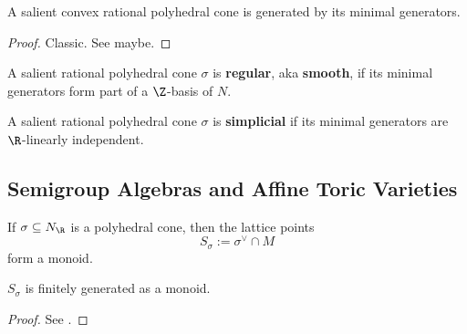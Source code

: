 \begin{lemma}
  \label{1-2-15-cone-hull-min-gen}

  A salient convex rational polyhedral cone is generated by its minimal generators.
\end{lemma}
\begin{proof}
  \uses{}

  Classic. See \cite{Oda_1988} maybe.
\end{proof}


\begin{definition}
  \label{1-2-16-reg-cone}

  A salient rational polyhedral cone $\sigma$ is {\bf regular}, aka {\bf smooth}, if its minimal generators form part of a $\Z$-basis of $N$.
\end{definition}


\begin{definition}
  \label{1-2-16-simplicial-cone}

  A salient rational polyhedral cone $\sigma$ is {\bf simplicial} if its minimal generators are $\R$-linearly independent.
\end{definition}


\subsection{Semigroup Algebras and Affine Toric Varieties}


\begin{definition}
  \label{1-2-17-dual-lat-cone}

  If $\sigma \subseteq N_\R$ is a polyhedral cone, then the lattice points
  \[
    S_\sigma := \sigma^\vee \cap M
  \]
  form a monoid.
\end{definition}


\begin{proposition}
  \label{1-2-17-gordan-lemma}

  $S_\sigma$ is finitely generated as a monoid.
\end{proposition}
\begin{proof}

  See \cite{Cox_2011}.
\end{proof}


